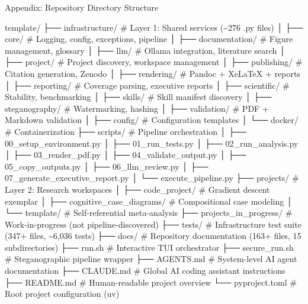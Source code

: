 \documentclass[
  ignorenonframetext,
]{beamer}
\author{\texorpdfstring{}{}}
\date{}
\newenvironment{Shaded}{}{}
\newcommand{\NormalTok}[1]{#1}
\begin{document}
\begin{frame}
\newpage
\end{frame}

\begin{frame}[fragile]{Appendix: Repository Directory Structure}
\protect{}\label{appendix-directory}
\begin{Shaded}
\begin{Highlighting}[]
\NormalTok{template/}
\NormalTok{├── infrastructure/           \# Layer 1: Shared services (\textasciitilde{}276 .py files)}
\NormalTok{│   ├── core/                 \# Logging, config, exceptions, pipeline}
\NormalTok{│   ├── documentation/        \# Figure management, glossary}
\NormalTok{│   ├── llm/                  \# Ollama integration, literature search}
\NormalTok{│   ├── project/              \# Project discovery, workspace management}
\NormalTok{│   ├── publishing/           \# Citation generation, Zenodo}
\NormalTok{│   ├── rendering/            \# Pandoc + XeLaTeX + reports}
\NormalTok{│   ├── reporting/            \# Coverage parsing, executive reports}
\NormalTok{│   ├── scientific/           \# Stability, benchmarking}
\NormalTok{│   ├── skills/               \# Skill manifest discovery}
\NormalTok{│   ├── steganography/        \# Watermarking, hashing}
\NormalTok{│   ├── validation/           \# PDF + Markdown validation}
\NormalTok{│   ├── config/               \# Configuration templates}
\NormalTok{│   └── docker/               \# Containerization}
\NormalTok{├── scripts/                  \# Pipeline orchestration}
\NormalTok{│   ├── 00\_setup\_environment.py}
\NormalTok{│   ├── 01\_run\_tests.py}
\NormalTok{│   ├── 02\_run\_analysis.py}
\NormalTok{│   ├── 03\_render\_pdf.py}
\NormalTok{│   ├── 04\_validate\_output.py}
\NormalTok{│   ├── 05\_copy\_outputs.py}
\NormalTok{│   ├── 06\_llm\_review.py}
\NormalTok{│   ├── 07\_generate\_executive\_report.py}
\NormalTok{│   └── execute\_pipeline.py}
\NormalTok{├── projects/                 \# Layer 2: Research workspaces}
\NormalTok{│   ├── code\_project/         \# Gradient descent exemplar}
\NormalTok{│   ├── cognitive\_case\_diagrams/ \# Compositional case modeling}
\NormalTok{│   └── template/             \# Self{-}referential meta{-}analysis}
\NormalTok{├── projects\_in\_progress/     \# Work{-}in{-}progress (not pipeline{-}discovered)}
\NormalTok{├── tests/                    \# Infrastructure test suite (347+ files, \textasciitilde{}6,036 tests)}
\NormalTok{├── docs/                     \# Repository documentation (163+ files, 15 subdirectories)}
\NormalTok{├── run.sh                    \# Interactive TUI orchestrator}
\NormalTok{├── secure\_run.sh             \# Steganographic pipeline wrapper}
\NormalTok{├── AGENTS.md                 \# System{-}level AI agent documentation}
\NormalTok{├── CLAUDE.md                 \# Global AI coding assistant instructions}
\NormalTok{├── README.md                 \# Human{-}readable project overview}
\NormalTok{└── pyproject.toml            \# Root project configuration (uv)}
\end{Highlighting}
\end{Shaded}
\end{frame}
\end{document}
